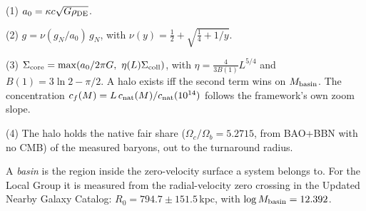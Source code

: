 \documentclass[10pt]{article}
\begin{document}
(1) $a_0=\kappa c\sqrt{G\rho_{\rm DE}}$.

(2) $g=\nu(g_N/a_0)\,g_N$, with $\nu(y)=\tfrac12+\sqrt{\tfrac14+1/y}$.

(3) $\Sigma_{\rm core}=\max(a_0/2\pi G,\ \eta(L)\Sigma_{\rm coll})$, with $\eta=\tfrac{4}{3B(1)}L^{5/4}$ and $B(1)=3\ln2-\pi/2$. A halo exists iff the second term wins on $M_{\rm basin}$. The concentration $c_f(M)=L\,c_{\rm nat}(M)/c_{\rm nat}(10^{14})$ follows the framework's own zoom slope.

(4) The halo holds the native fair share ($\Omega_c/\Omega_b=5.2715$, from BAO+BBN with no CMB) of the measured baryons, out to the turnaround radius.

A \emph{basin} is the region inside the zero-velocity surface a system belongs to. For the Local Group it is measured from the radial-velocity zero crossing in the Updated Nearby Galaxy Catalog: $R_0=794.7\pm151.5$\,kpc, with $\log M_{\rm basin}=12.392$.
\end{document}
